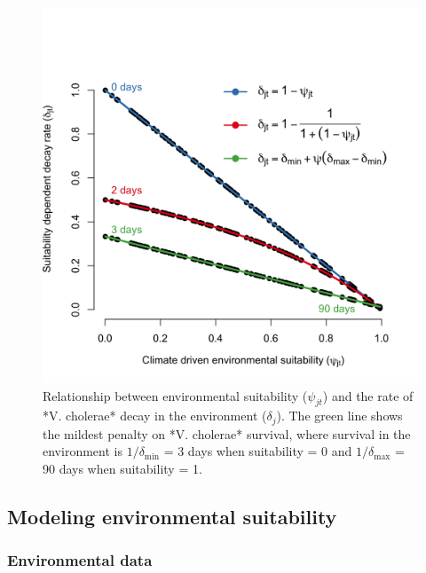 \documentclass[
]{book}
\begin{document}
\begin{figure}

{\centering \includegraphics[width=0.8\linewidth]{figures/shedding_rate} 

}

\caption{Relationship between environmental suitability ($\psi_{jt}$) and the rate of *V. cholerae* decay in the environment ($\delta_j$). The green line shows the mildest penalty on *V. cholerae* survival, where survival in the environment is $1/\delta_{\text{min}}$ = 3 days when suitability = 0 and $1/\delta_{\text{max}}$ = 90 days when suitability = 1.}\label{fig:unnamed-chunk-2}
\end{figure}

\subsection{Modeling environmental suitability}\label{modeling-environmental-suitability}

\subsubsection{Environmental data}\label{environmental-data}
\end{document}
